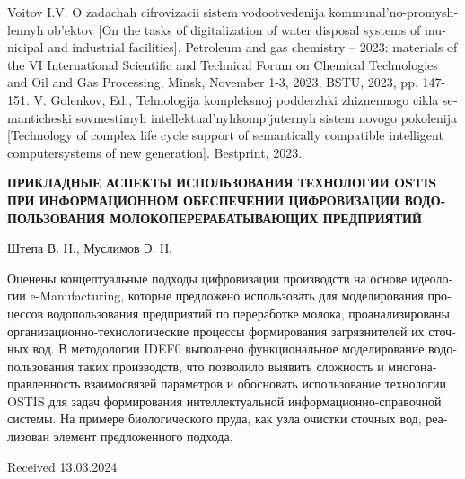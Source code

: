 \documentclass[10pt,final]{article}
\begin{document}
\begin{multicols}{2}
\begin{otherlanguage}{english}
\begin{thebibliography}{11}
        Voitov I.V. O zadachah cifrovizacii sistem vodootvedenija
kommunal’no-promyshlennyh ob’ektov [On the tasks of digitalization of water disposal systems of municipal and industrial
facilities]. Petroleum and gas chemistry – 2023: materials of
the VI International Scientific and Technical Forum on Chemical
Technologies and Oil and Gas Processing, Minsk, November 1-3,
2023, BSTU, 2023, pp. 147-151.
        V. Golenkov, Ed., Tehnologija kompleksnoj podderzhki
zhiznennogo cikla semanticheski sovmestimyh intellektual’nyhkomp’juternyh sistem novogo pokolenija [Technology of
complex life cycle support of semantically compatible intelligent
computersystems of new generation]. Bestprint, 2023.

\end{thebibliography}
\end{otherlanguage}
\begin{minipage}{0.4\textwidth}

\vspace{15.5cm}
\begin{otherlanguage}{russian}
\begin{center}  
  \textbf{ПРИКЛАДНЫЕ АСПЕКТЫ
ИСПОЛЬЗОВАНИЯ ТЕХНОЛОГИИ
OSTIS ПРИ ИНФОРМАЦИОННОМ
ОБЕСПЕЧЕНИИ ЦИФРОВИЗАЦИИ ВОДОПОЛЬЗОВАНИЯ
МОЛОКОПЕРЕРАБАТЫВАЮЩИХ
ПРЕДПРИЯТИЙ}

\vspace{5}

Штепа В. Н., Муслимов Э. Н.

 \end{center}
 
 \vspace{4}
 \scriptsize
 
{Оценены концептуальные подходы цифровизации производств на основе идеологии e-Manufacturing, которые предложено использовать для моделирования процессов водопользования предприятий по переработке молока, проанализированы организационно-технологические процессы формирования загрязнителей их сточных вод. В методологии IDEF0
выполнено функциональное моделирование водопользования таких производств, что позволило выявить сложность
и многонаправленность взаимосвязей параметров и обосновать использование технологии OSTIS для задач формирования интеллектуальной информационно-справочной системы.
На примере биологического пруда, как узла очистки сточных
вод, реализован элемент предложенного подхода.}
\end{otherlanguage}

\begin{flushright}
    Received 13.03.2024
\end{flushright}

\end{minipage}

\end{multicols}
\end{document}
